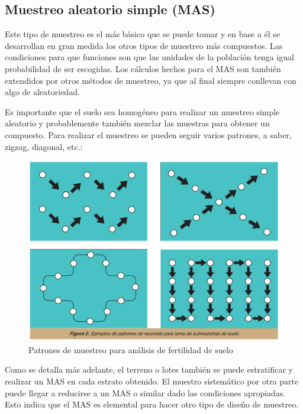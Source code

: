 \documentclass{report}
\begin{document}
\subsection{Muestreo aleatorio simple (MAS)}

Este tipo de muestreo es el más básico que se puede tomar y en base a él se desarrollan en gran medida los otros tipos de muestreo más compuestos. Las condiciones para que funciones son que las unidades de la población tenga igual probabilidad de ser escogidas. Los cálculos hechos para el MAS son también extendidos por otros métodos de muestreo, ya que al final siempre conllevan con algo de aleatoriedad. 

\bigbreak

Es importante que el suelo sea homogéneo para realizar un muestreo simple aleatorio y probablemente también mezclar las muestras para obtener un compuesto. Para realizar el muestreo se pueden seguir varios patrones, a saber, zigzag, diagonal, etc.:

\begin{figure}[H]
    \centering
    \includegraphics[width=0.3\paperwidth]{ref/sampling-patterns-srs.png}
    \caption{Patrones de muestreo para análisis de fertilidad de suelo \cite{lassaga-2011}}
\end{figure}

Como se detalla más adelante, el terreno o lotes también se puede estratificar y realizar un MAS en cada estrato obtenido. El muestro sistemático por otra parte puede llegar a reducirse a un MAS o similar dado las condiciones apropiadas. Esto indica que el MAS es elemental para hacer otro tipo de diseño de muestreo.
\end{document}
